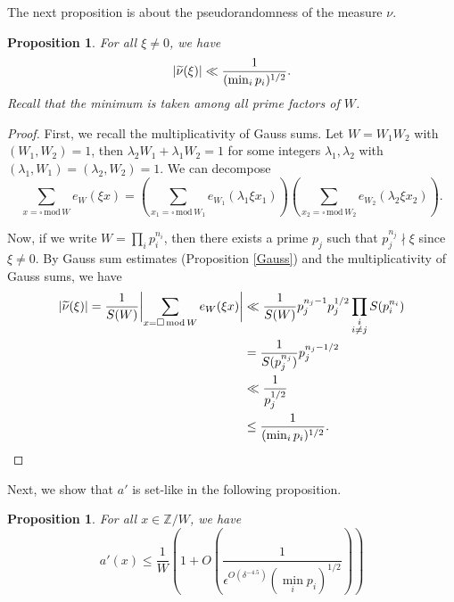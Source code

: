 \documentclass[11pt]{amsart}
\theoremstyle{plain} %
\newtheorem{prop}[thm]{Proposition}
\theoremstyle{remark}
\numberwithin{equation}{section}
\newcommand{\Z}{\mathbb{Z}}
\DeclarePairedDelimiter\abs{\lvert}{\rvert}
\newcommand{\sqw}[1]{\sum_{#1=\square\,\mathrm{mod}\,W}}
\newcommand{\sqwone}[1]{\sum_{#1=\square\,\mathrm{mod}\,W_1}}
\newcommand{\sqwtwo}[1]{\sum_{#1=\square\,\mathrm{mod}\,W_2}}
\begin{document}
The next proposition is about the pseudorandomness of the measure $\nu$.

\begin{prop}\label{pseudorandomness}
    For all $\xi\neq 0$, we have
    \begin{equation*}
        \abs{\widetilde{\nu}(\xi)}\ll \frac{1}{(\min_i p_i)^{1/2}}.
    \end{equation*}
    Recall that the minimum is taken among all prime factors of $W$.
\end{prop}

\begin{proof}
    First, we recall the multiplicativity of Gauss sums. Let $W=W_1W_2$ with $(W_1,W_2)=1$, then $\lambda_2W_1+\lambda_1W_2=1$ for some integers $\lambda_1,\lambda_2$ with $(\lambda_1,W_1)=(\lambda_2,W_2)=1$. We can decompose
    \begin{equation*}
        \sqw{x}e_W(\xi x)=\left(\sqwone{x_1}e_{W_1}(\lambda_1\xi x_1)\right)\left(\sqwtwo{x_2}e_{W_2}(\lambda_2\xi x_2)\right).
    \end{equation*}

    Now, if we write $W=\prod_i p_i^{n_i}$, then there exists a prime $p_j$ such that $p_j^{n_j}\nmid \xi$ since $\xi\neq 0$. By Gauss sum estimates (Proposition \ref{Gauss}) and the multiplicativity of Gauss sums, we have
    \begin{equation*}
        \begin{split}
            \abs{\widetilde{\nu}(\xi)}=\frac{1}{S(W)}\abs[\bigg]{\sqw{x}e_W(\xi x)}&\ll \frac{1}{S(W)} p_j^{n_j-1}p_j^{1/2} \prod_{\substack{i\\i\neq j}} S(p_i^{n_i})\\
            &=\frac{1}{S(p_j^{n_j})} p_j^{n_j-1/2}\\
            &\ll \frac{1}{p_j^{1/2}}\\
            &\leq \frac{1}{(\min_i p_i)^{1/2}}.
        \end{split}
    \end{equation*}
\end{proof}

Next, we show that $a'$ is set-like in the following proposition.

\begin{prop}\label{set-like}
    For all $x\in\Z/W$, we have
    \begin{equation*}
        a'(x)\leq \frac{1}{W}\left(1+O\left(\frac{1}{\epsilon^{O(\delta^{-4.5})}(\min_i p_i)^{1/2}}\right)\right)
    \end{equation*}
\end{prop}
\end{document}
